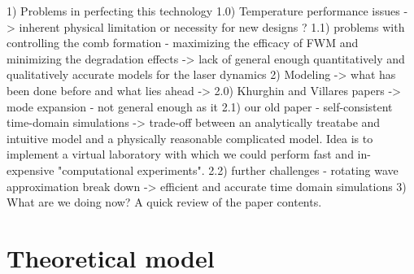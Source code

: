\documentclass[journal]{IEEEtran}
\begin{document}
	
		
	1) Problems in perfecting this technology
		1.0) Temperature performance issues -> inherent physical limitation or necessity for new designs ?  
		1.1) problems with controlling the comb formation - maximizing the efficacy of FWM and minimizing the degradation effects -> lack of general enough quantitatively and qualitatively accurate models for the laser dynamics
	2) Modeling -> what has been done before and what lies ahead ->
		2.0) Khurghin and Villares papers -> mode expansion - not general enough as it 
		2.1) our old paper - self-consistent time-domain simulations -> trade-off between an analytically treatabe and intuitive model and a physically reasonable complicated model. Idea is to implement a virtual laboratory with which we could perform fast and in-expensive "computational experiments". 
		2.2) further challenges -  rotating wave approximation break down -> efficient and accurate time domain simulations 
	3) What are we doing now? A quick review of the paper contents.
	
%	
%	

	\section{Theoretical model}
	\label{sec:theory}
	
\end{document}
